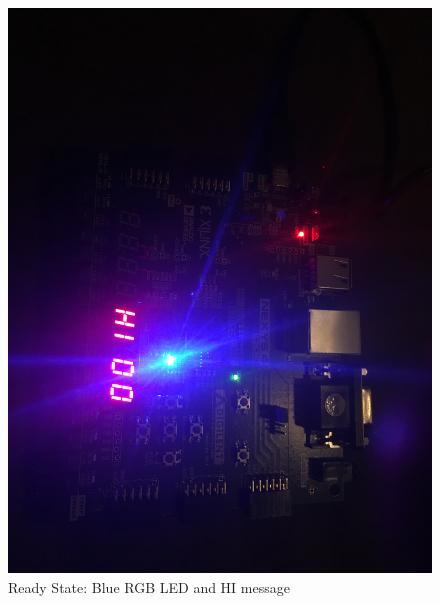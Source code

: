 \documentclass{article}
\begin{document}
\begin{center}
	\begin{figure}
		\includegraphics[width=.9\linewidth]{Ready.JPG}
		\caption{Ready State: Blue RGB LED and HI message}
		\label{fig:ReadyImg}
	\end{figure}


\end{center}
\end{document}
